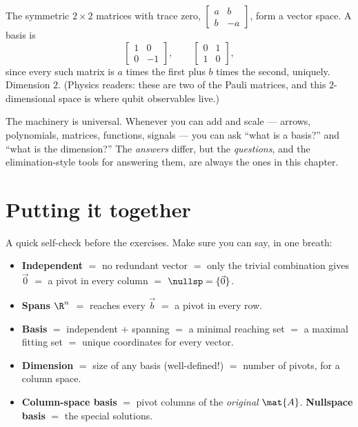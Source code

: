 \begin{example}
\label{ch14:ex-matrices}
The symmetric $2\times 2$ matrices with trace zero, $\begin{bmatrix} a & b\\ b &
-a\end{bmatrix}$, form a vector space. A basis is
\[
  \begin{bmatrix} 1 & 0\\ 0 & -1\end{bmatrix},\qquad
  \begin{bmatrix} 0 & 1\\ 1 & 0\end{bmatrix},
\]
since every such matrix is $a$ times the first plus $b$ times the second, uniquely.
Dimension $2$. (Physics readers: these are two of the Pauli matrices, and this
$2$-dimensional space is where qubit observables live.)
\end{example}

\begin{focusbox}
The machinery is universal. Whenever you can add and scale --- arrows, polynomials,
matrices, functions, signals --- you can ask ``what is a basis?'' and ``what is the
dimension?'' The \emph{answers} differ, but the \emph{questions}, and the
elimination-style tools for answering them, are always the ones in this chapter.
\end{focusbox}

\section{Putting it together}
\label{ch14:together}

\begin{recoverybox}
A quick self-check before the exercises. Make sure you can say, in one breath:
\begin{itemize}
  \item \textbf{Independent} $=$ no redundant vector $=$ only the trivial
        combination gives $\vec{0}$ $=$ a pivot in every column $=$
        $\nullsp = \{\vec{0}\}$.
  \item \textbf{Spans $\R^n$} $=$ reaches every $\vec{b}$ $=$ a pivot in every row.
  \item \textbf{Basis} $=$ independent $+$ spanning $=$ a minimal reaching set $=$
        a maximal fitting set $=$ unique coordinates for every vector.
  \item \textbf{Dimension} $=$ size of any basis (well-defined!) $=$ number of
        pivots, for a column space.
  \item \textbf{Column-space basis} $=$ pivot columns of the \emph{original}
        $\mat{A}$. \textbf{Nullspace basis} $=$ the special solutions.
\end{itemize}
\end{recoverybox}

